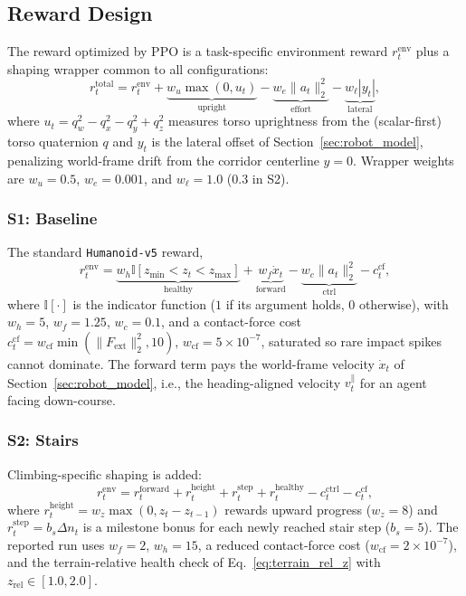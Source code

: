 \documentclass[conference,a4paper]{IEEEtran}
\begin{document}
\subsection{Reward Design}
\label{sec:reward_design}

The reward optimized by PPO is a task-specific environment reward $r_t^{\mathrm{env}}$ plus a shaping wrapper common to all configurations:
\begin{equation}
\label{eq:total_reward}
r_t^{\mathrm{total}} = r_t^{\mathrm{env}} + \underbrace{w_u \max(0, u_t)}_{\text{upright}} - \underbrace{w_e \|a_t\|_2^2}_{\text{effort}} - \underbrace{w_\ell |y_t|}_{\text{lateral}},
\end{equation}
where $u_t = q_{w}^2 - q_{x}^2 - q_{y}^2 + q_{z}^2$ measures torso uprightness from the (scalar-first) torso quaternion $q$ and $y_t$ is the lateral offset of Section~\ref{sec:robot_model}, penalizing world-frame drift from the corridor centerline $y{=}0$. Wrapper weights are $w_u = 0.5$, $w_e = 0.001$, and $w_\ell = 1.0$ ($0.3$ in S2).

\subsubsection{S1: Baseline} The standard \texttt{Humanoid-v5} reward,
\begin{equation}
\label{eq:s1_reward}
r_t^{\mathrm{env}} = \underbrace{w_h \mathbb{I}\!\left[z_{\min} {<} z_t {<} z_{\max}\right]}_{\text{healthy}} + \underbrace{w_f \dot{x}_t}_{\text{forward}} - \underbrace{w_c \lVert a_t \rVert_2^2}_{\text{ctrl}} - c_t^{\mathrm{cf}},
\end{equation}
where $\mathbb{I}[\cdot]$ is the indicator function ($1$ if its argument holds, $0$ otherwise), with $w_h = 5$, $w_f = 1.25$, $w_c = 0.1$, and a contact-force cost $c_t^{\mathrm{cf}} = w_{\mathrm{cf}}\min(\lVert F_{\mathrm{ext}} \rVert_2^2, 10)$, $w_{\mathrm{cf}} = 5 \times 10^{-7}$, saturated so rare impact spikes cannot dominate. The forward term pays the world-frame velocity $\dot{x}_t$ of Section~\ref{sec:robot_model}, i.e., the heading-aligned velocity $v_t^{\parallel}$ for an agent facing down-course.

\subsubsection{S2: Stairs} Climbing-specific shaping is added:
\begin{equation}
\label{eq:s2_reward}
r_t^{\mathrm{env}} = r_t^{\mathrm{forward}} + r_t^{\mathrm{height}} + r_t^{\mathrm{step}} + r_t^{\mathrm{healthy}} - c_t^{\mathrm{ctrl}} - c_t^{\mathrm{cf}},
\end{equation}
where $r_t^{\mathrm{height}} = w_z \max(0, z_t - z_{t-1})$ rewards upward progress ($w_z = 8$) and $r_t^{\mathrm{step}} = b_s \Delta n_t$ is a milestone bonus for each newly reached stair step ($b_s = 5$). The reported run uses $w_f = 2$, $w_h = 15$, a reduced contact-force cost ($w_{\mathrm{cf}} = 2 \times 10^{-7}$), and the terrain-relative health check of Eq.~\eqref{eq:terrain_rel_z} with $z_{\mathrm{rel}} \in [1.0, 2.0]$.
\end{document}
